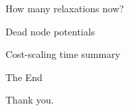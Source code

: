 \documentclass[xcolor={dvipsnames,usenames}]{beamer}
\newcommand{\eps}{\varepsilon}
\begin{document}
\begin{frame}{How many relaxations now?}
\end{frame}

\begin{frame}{Dead node potentials}
\end{frame}

\begin{frame}{Cost-scaling time summary}
\end{frame}


\begin{frame}{The End}
\begin{center}
	Thank you.
\end{center}
\end{frame}







%
%
\end{document}
